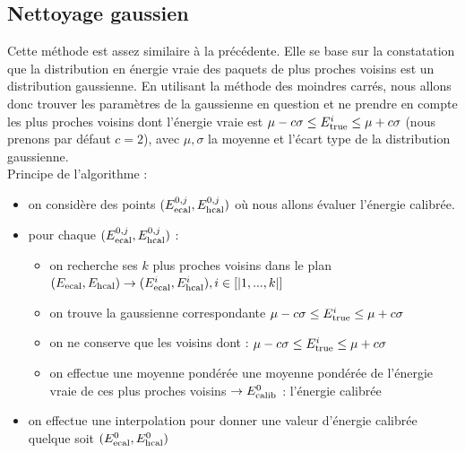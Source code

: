 \documentclass[11pt,a4paper]{article}
\begin{document}
\subsection{Nettoyage gaussien}
Cette méthode est assez similaire à la précédente. Elle se base sur la constatation que la distribution en énergie vraie des paquets de plus proches voisins est un distribution gaussienne. En utilisant la méthode des moindres carrés, nous allons donc  trouver les paramètres de la gaussienne en question et ne prendre en compte les plus proches voisins dont l'énergie vraie est $\mu -c\sigma \leq E_{\rm true}^i \leq \mu + c\sigma$ (nous prenons par défaut $c = 2$), avec $\mu, \sigma$ la moyenne et l'écart type de la distribution gaussienne.\\
Principe de l'algorithme :
\begin{itemize}
	\item on considère des points $(E_{\rm ecal}^{0,j}, E_{\rm hcal}^{0,j})$ où nous allons évaluer l'énergie calibrée.
	\item pour chaque $(E_{\rm ecal}^{0,j}, E_{\rm hcal}^{0,j})$ :
	\begin{itemize}
		\item on recherche ses $k$ plus proches voisins dans le plan $(E_{\rm ecal}, E_{\rm hcal}) \rightarrow (E_{\rm ecal}^i, E_{\rm hcal}^i), i \in [|1,...,k|]$
		\item on trouve la gaussienne correspondante $\mu -c\sigma \leq E_{\rm true}^i \leq \mu + c\sigma$
		\item on ne conserve que les voisins dont : $\mu -c\sigma \leq E_{\rm true}^i \leq \mu + c\sigma$
		\item on effectue une moyenne pondérée une moyenne pondérée de l'énergie vraie de ces plus proches voisins $\rightarrow E_{\rm calib}^0$ : l'énergie calibrée 
	\end{itemize}
	\item on effectue une interpolation pour donner une valeur d'énergie calibrée quelque soit $(E_{\rm ecal}^{0}, E_{\rm hcal}^{0})$
\end{itemize}
\end{document}
